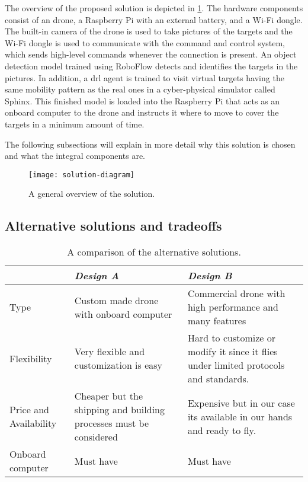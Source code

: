 \documentclass[../main.tex]{subfiles}
\begin{document}
	
The overview of the proposed solution is depicted in 
\cref{fig:solution-overview}. 
The hardware components consist of an \anafi drone,
a Raspberry Pi with an external battery, and a Wi-Fi
dongle. The built-in camera of the drone is used to
take pictures of the targets and the Wi-Fi dongle
is used to communicate with the command and control
system, which sends high-level commands whenever the
connection is present. An object detection model trained
using RoboFlow detects and identifies the targets in the
pictures. In addition, a \gls{drl} agent is trained to
visit virtual targets having the same mobility pattern as the
real ones in a cyber-physical simulator called Sphinx.
This finished model is loaded into the Raspberry Pi that acts
as an onboard computer to the \anafi drone and instructs
it where to move to cover the targets in a minimum amount
of time.

The following subsections will
explain in more detail why this solution is chosen
and what the integral components are.

\begin{figure}[tbp]
	\centering
	\texttt{[image: solution-diagram]}
	\caption{A general overview of the solution.}
	\label{fig:solution-overview}
\end{figure}

\subsection{Alternative solutions and tradeoffs}

\begin{table}[b]
    \centering
    \caption{A comparison of the alternative solutions.}
    \label{tab:alt-solutions}
    \begin{tabularx}{\textwidth}{ p{4cm} X X }
        \toprule
        \textit{} & \textit{Design A} & \textit{Design B}\\ \midrule
        Type  & Custom made drone with onboard computer & Commercial drone with high performance and many features    \\
        Flexibility & Very flexible and customization is easy & Hard to customize or modify it since it flies under limited protocols and standards. \\

        Price and Availability & Cheaper but the shipping and building processes must be considered & Expensive but in our case its available in our hands and ready to fly.   \\

        Onboard computer & Must have & Must have \\
        \bottomrule
    \end{tabularx}
\end{table} 
\end{document}
